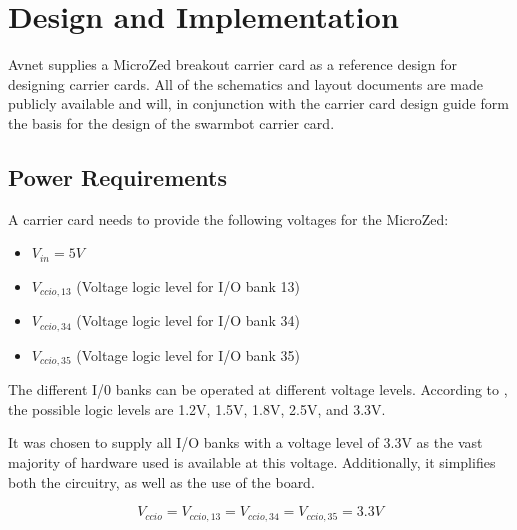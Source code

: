 \section{Design and Implementation}
Avnet supplies a MicroZed breakout carrier card as a reference design for designing carrier cards.
All of the schematics and layout documents are made publicly available and will, in conjunction with the carrier card design guide \cite{design_carrier} form the basis for the design of the swarmbot carrier card.

\subsection{Power Requirements}
\label{sub:power_req}
A carrier card  needs to provide the following voltages for the MicroZed:
\begin{itemize}
	\item $V_{in} = 5V$
	\item $V_{ccio,13}$ (Voltage logic level for I/O bank 13)
	\item $V_{ccio,34}$ (Voltage logic level for I/O bank 34)
	\item $V_{ccio,35}$ (Voltage logic level for I/O bank 35)
\end{itemize}
The different I/0 banks can be operated at different voltage levels.
According to \cite{zynq_dc}, the possible logic levels are 1.2V, 1.5V, 1.8V, 2.5V, and 3.3V.

It was chosen to supply all I/O banks with a voltage level of 3.3V as the vast majority of hardware used is available at this voltage.
Additionally, it simplifies both the circuitry, as well as the use of the board.

$$ V_{ccio} =  V_{ccio,13} = V_{ccio,34} = V_{ccio,35} = 3.3V$$

